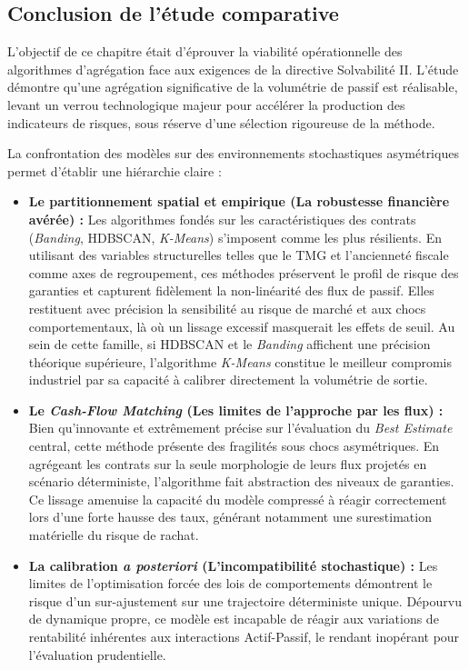 \subsection{Conclusion de l'étude comparative}

L'objectif de ce chapitre était d'éprouver la viabilité opérationnelle des algorithmes d'agrégation face aux exigences de la directive Solvabilité II. L'étude démontre qu'une agrégation significative de la volumétrie de passif est réalisable, levant un verrou technologique majeur pour accélérer la production des indicateurs de risques, sous réserve d'une sélection rigoureuse de la méthode.

La confrontation des modèles sur des environnements stochastiques asymétriques permet d'établir une hiérarchie claire :

\begin{itemize}
    \item \textbf{Le partitionnement spatial et empirique (La robustesse financière avérée) :} Les algorithmes fondés sur les caractéristiques des contrats (\textit{Banding}, HDBSCAN, \textit{K-Means}) s'imposent comme les plus résilients. En utilisant des variables structurelles telles que le TMG et l'ancienneté fiscale comme axes de regroupement, ces méthodes préservent le profil de risque des garanties et capturent fidèlement la non-linéarité des flux de passif. Elles restituent avec précision la sensibilité au risque de marché et aux chocs comportementaux, là où un lissage excessif masquerait les effets de seuil. Au sein de cette famille, si HDBSCAN et le \textit{Banding} affichent une précision théorique supérieure, l'algorithme \textit{K-Means} constitue le meilleur compromis industriel par sa capacité à calibrer directement la volumétrie de sortie.
    
    \item \textbf{Le \textit{Cash-Flow Matching} (Les limites de l'approche par les flux) :} Bien qu'innovante et extrêmement précise sur l'évaluation du \textit{Best Estimate} central, cette méthode présente des fragilités sous chocs asymétriques. En agrégeant les contrats sur la seule morphologie de leurs flux projetés en scénario déterministe, l'algorithme fait abstraction des niveaux de garanties. Ce lissage amenuise la capacité du modèle compressé à réagir correctement lors d'une forte hausse des taux, générant notamment une surestimation matérielle du risque de rachat. 
    
    \item \textbf{La calibration \textit{a posteriori} (L'incompatibilité stochastique) :} Les limites de l'optimisation forcée des lois de comportements démontrent le risque d'un sur-ajustement sur une trajectoire déterministe unique. Dépourvu de dynamique propre, ce modèle est incapable de réagir aux variations de rentabilité inhérentes aux interactions Actif-Passif, le rendant inopérant pour l'évaluation prudentielle.
\end{itemize}

